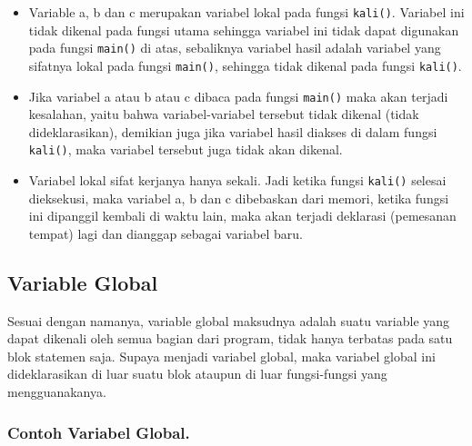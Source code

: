 \begin{itemize}

\item
  Variable a, b dan c merupakan variabel lokal pada fungsi
  \texttt{kali()}. Variabel ini tidak dikenal pada fungsi utama sehingga
  variabel ini tidak dapat digunakan pada fungsi \texttt{main()} di
  atas, sebaliknya variabel hasil adalah variabel yang sifatnya lokal
  pada fungsi \texttt{main()}, sehingga tidak dikenal pada fungsi
  \texttt{kali()}.\\
\item
  Jika variabel a atau b atau c dibaca pada fungsi \texttt{main()} maka
  akan terjadi kesalahan, yaitu bahwa variabel-variabel tersebut tidak
  dikenal (tidak dideklarasikan), demikian juga jika variabel hasil
  diakses di dalam fungsi \texttt{kali()}, maka variabel tersebut juga
  tidak akan dikenal.\\
\item
  Variabel lokal sifat kerjanya hanya sekali. Jadi ketika fungsi
  \texttt{kali()} selesai dieksekusi, maka variabel a, b dan c
  dibebaskan dari memori, ketika fungsi ini dipanggil kembali di waktu
  lain, maka akan terjadi deklarasi (pemesanan tempat) lagi dan dianggap
  sebagai variabel baru.
\end{itemize}

\subsection{Variable Global}\label{variable-global}

Sesuai dengan namanya, variable global maksudnya adalah suatu variable
yang dapat dikenali oleh semua bagian dari program, tidak hanya terbatas
pada satu blok statemen saja. Supaya menjadi variabel global, maka
variabel global ini dideklarasikan di luar suatu blok ataupun di luar
fungsi-fungsi yang mengguanakanya.

\subsubsection*{Contoh  Variabel Global.}

